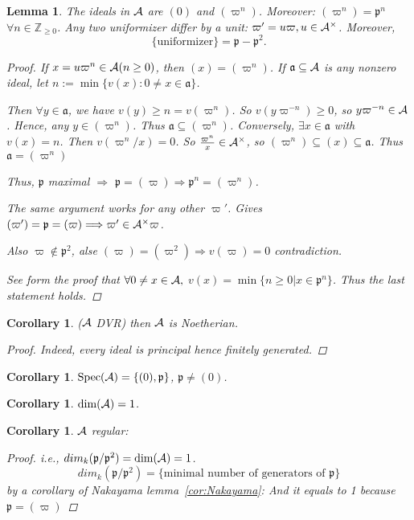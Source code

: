 \documentclass[11pt]{article}
\newtheorem{lemma}[thm]{Lemma}
\newtheorem{cor}[thm]{Corollary}
\newcommand{\intg}{\mathbb Z}
\newcommand{\sca}{{\mathfrak a}}
\newcommand{\scp}{{\mathfrak p}}
\newcommand{\cala}{{\cal A}}
\newcommand{\Lrta}{\Longrightarrow}
\begin{document}
\begin{lemma}\label{lem:DVR_PID+}
The ideals in $\cala$ are $(0)$ and $(\varpi^n)$. Moreover: $(\varpi^n)=\scp^n$ $\forall n\in \intg_{\geq 0}$. Any two uniformizer differ by a unit: $\varpi'=u\varpi,u\in \cala^\times$. Moreover,
$$
\{\text{uniformizer}\}=\scp-\scp^2.
$$
\begin{proof}
If $x=u\varpi^n\in \cala (n\geq 0)$, then $(x)=(\varpi^n)$. If $\sca\subseteq \cala$ is any nonzero ideal, let $n:=\min\{v(x):0\neq x\in \sca\}$.

Then $\forall y\in \sca$, we have $v(y)\geq n =v(\varpi^n)$. So $v(y\varpi^{-n})\geq 0$, so $y\varpi^{-n}\in\cala$. Hence, any $y\in (\varpi^n)$. Thus $\sca\subseteq (\varpi^n)$. Conversely, $\exists x\in \sca$ with $v(x)=n$. Then $v(\varpi^n/x)=0$. So $\frac{\varpi^n}{x}\in \cala^\times$, so $(\varpi^n)\subseteq (x)\subseteq \sca$. Thus $\sca=(\varpi^n)$

Thus, $\scp$ maximal $\Lrta$ $\scp=(\varpi)\Lrta \scp^n=(\varpi^n)$.

The same argument works for any other $\varpi'$. Gives $(\varpi')=\scp=(\varpi)\Lrta \varpi'\in\cala^\times\varpi$.

Also $\varpi\notin\scp^2$, alse $(\varpi)=(\varpi^2)\Lrta v(\varpi)=0$ contradiction.

See form the proof that $\forall 0\neq x\in \cala,$
$v(x)=\min\{n\geq 0|x\in \scp^n\}$. Thus the last statement holds.
\end{proof}
\end{lemma}
\begin{cor}
($\cala$ DVR) then $\cala$ is Noetherian.
\begin{proof}
Indeed, every ideal is principal hence finitely generated.
\end{proof}
\end{cor}

\begin{cor}
$\text{Spec}(\cala)=\{(0),\scp\}$, $\scp\neq (0)$.
\end{cor}

\begin{cor}
$\text{dim}(\cala)=1$.
\end{cor}

\begin{cor}\label{cor:PID-_regular}
$\cala$ regular:
\begin{proof}
i.e., $dim_k(\scp/\scp^2)=\text{dim}(\cala)=1$. 
$$
dim_k(\scp/\scp^2)=\{\text{minimal number of generators of $\scp$}\}
$$
by a corollary of Nakayama lemma~\ref{cor:Nakayama}:
And it equals to 1 because $\scp=(\varpi)$
\end{proof}
\end{cor}
\end{document}
